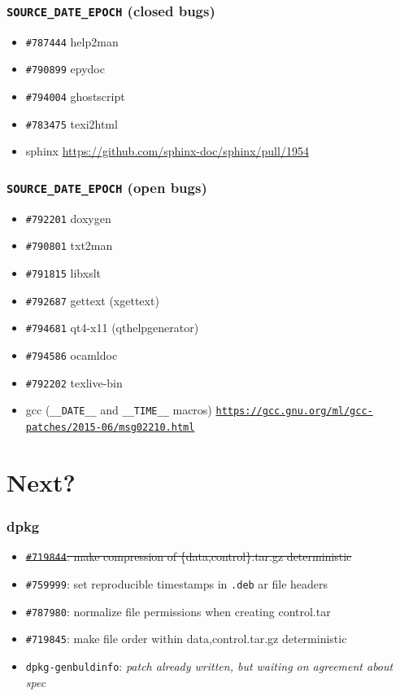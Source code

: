 \documentclass[14pt]{beamer}
\begin{document}
\begin{frame}
 \frametitle{\texttt{SOURCE\_DATE\_EPOCH} (closed bugs)}

 \begin{itemize}
  \item \texttt{\#787444} help2man
  \item \texttt{\#790899} epydoc
  \item \texttt{\#794004} ghostscript
  \item \texttt{\#783475} texi2html
  \item sphinx \small{\url{https://github.com/sphinx-doc/sphinx/pull/1954}}
 \end{itemize}

\end{frame}

\begin{frame}
 \frametitle{\texttt{SOURCE\_DATE\_EPOCH} (open bugs)}

 \begin{itemize}
  \item \texttt{\#792201} doxygen
  \item \texttt{\#790801} txt2man
  \item \texttt{\#791815} libxslt
  \item \texttt{\#792687} gettext (xgettext)
  \item \texttt{\#794681} qt4-x11 (qthelpgenerator)
  \item \texttt{\#794586} ocamldoc
  \item \texttt{\#792202} texlive-bin
  \item gcc (\texttt{\_\_DATE\_\_} and \texttt{\_\_TIME\_\_} macros) \texttt{\footnotesize{\url{https://gcc.gnu.org/ml/gcc-patches/2015-06/msg02210.html}}}
 \end{itemize}

\end{frame}

\section{Next?}

\begin{frame}
 \frametitle{dpkg}

 \begin{itemize}\small
  \item \sout{\texttt{\#719844}: make compression of \{data,control\}.tar.gz deterministic}
  \item \texttt{\#759999}: set reproducible timestamps in \texttt{.deb} ar file headers
  \item \texttt{\#787980}: normalize file permissions when creating control.tar
  \item \texttt{\#719845}: make file order within {data,control}.tar.gz deterministic
  \item \texttt{dpkg-genbuldinfo}: \textit{patch already written, but waiting on agreement about spec}
 \end{itemize}
\end{frame}
\end{document}
